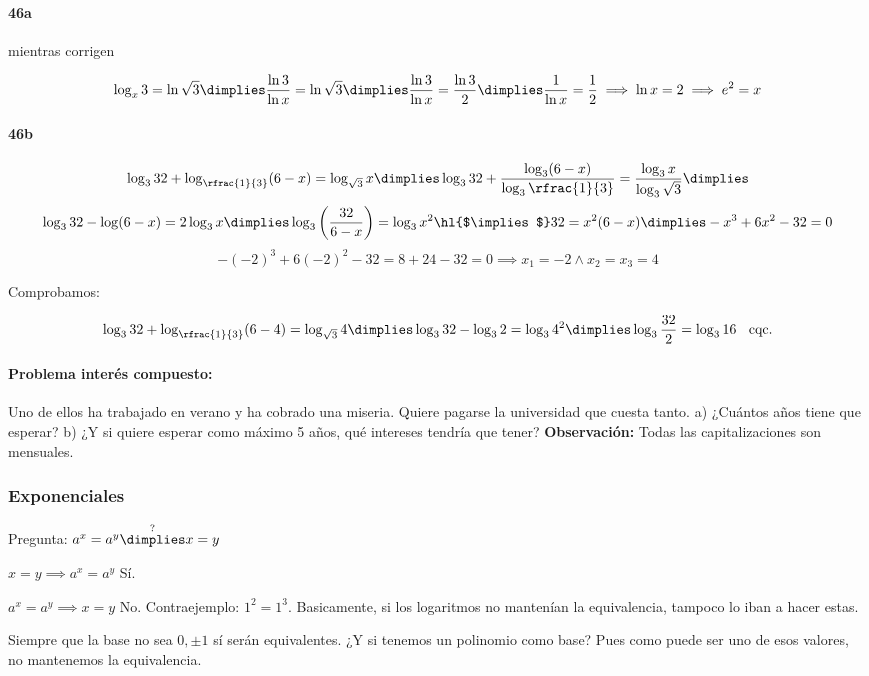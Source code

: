 \documentclass[palatino,nosec]{Docencia}
\newcommand{\cimplies}{\text{\hl{$\implies$}}}
\begin{document}
\paragraph{46a} mientras corrigen

\[
	\log_x 3 = \ln \sqrt{3} \dimplies \frac{\ln3}{\ln x}=\ln\sqrt{3} \dimplies \frac{\ln3}{\ln x}=\frac{\ln3}{2} \dimplies \frac{1}{\ln x}=\frac{1}{2} \implies \ln x = 2 \implies e^2=x
\]

\paragraph{46b}
\[
	\log_332+\log_{\rfrac{1}{3}}(6-x) = \log_{\sqrt{3}}x \dimplies \log_332+\frac{\log_3(6-x)}{\log_3\rfrac{1}{3}} = \frac{\log_3x}{\log_3{\sqrt{3}}} \dimplies 
\]
\[
	\log_332-\log(6-x)=2\log_3x\dimplies \log_3\left(\frac{32}{6-x}\right)=\log_3x^2 \cimplies 32=x^2(6-x) \dimplies -x^3+6x^2-32 = 0
\]
\[
	-(-2)^3 + 6(-2)^2-32 = 8+24-32 = 0\implies x_1=-2 \wedge x_2=x_3=4
\]
 
Comprobamos:

\[
	\log_332+\log_{\rfrac{1}{3}}(6-4) = \log_{\sqrt{3}}4 \dimplies \log_332-\log_32=\log_34^2 \dimplies \log_3\frac{32}{2}=\log_316 \;\;\text{   cqc.}
\]


\paragraph{Problema interés compuesto:} Uno de ellos ha trabajado en verano y ha cobrado una miseria. Quiere pagarse la universidad que cuesta tanto.
a) ¿Cuántos años tiene que esperar?
b) ¿Y si quiere esperar como máximo 5 años, qué intereses tendría que tener?
\textbf{Observación:} Todas las capitalizaciones son mensuales.


\subsubsection{Exponenciales}

Pregunta: $a^x=a^y \overset{?}{\dimplies} x=y$

$x=y\implies a^x=a^y$ Sí.

$a^x=a^y\implies x=y$ No. Contraejemplo: $1^2=1^3$.  Basicamente, si los logaritmos no mantenían la equivalencia, tampoco lo iban a hacer estas.

Siempre que la base no sea $0,±1$ sí serán equivalentes. ¿Y si tenemos un polinomio como base? Pues como puede ser uno de esos valores, no mantenemos la equivalencia.
\end{document}
